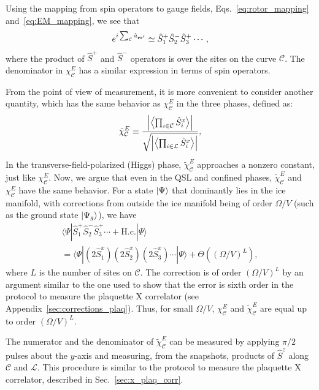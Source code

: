 \documentclass[twocolumn,superscriptaddress,amsmath,amssymb,aps,prx,nofootinbib]{revtex4-2}
\begin{document}
Using the mapping from spin operators to gauge fields, Eqs.~\eqref{eq:rotor_mapping} and~\eqref{eq:EM_mapping}, we see that
\begin{equation} 
   e^{i\sum_\mathcal{C} \hat{a}_{\vb{r} \vb{r}'}} \simeq \hat{S}_1^+\hat{S}_2^-\hat{S}_3^+\cdots,
\end{equation}
where the product of $\hat{S}^+$ and $ \hat{S}^-$ operators is over the sites on the curve $\mathcal{C}$.  The denominator in $\chi_{\mathcal{C}}^E$ has a similar expression in terms of spin operators. 

From the point of view of measurement, it is more convenient to consider another quantity,  which has the same behavior as $\chi_\mathcal{C}^E$ in the three phases, defined as:
\begin{equation}
\tilde{\chi}_\mathcal{C}^E \equiv \frac{\abs{ \expval{ \prod_{i\in \mathcal{C}} \hat{S}_i^x  } } }{\sqrt{ \abs{ \expval{ \prod_{i\in \mathcal{L}} \hat{S}_i^x  }  }}},
\end{equation}
In the transverse-field-polarized (Higgs) phase, $\tilde{\chi}_\mathcal{C}^E$ approaches a nonzero constant, just like $\chi_\mathcal{C}^E$. Now, we argue that even in the QSL and confined phases, $\tilde{\chi}_\mathcal{C}^E$ and $\chi_\mathcal{C}^E$ have the same behavior.  
For a state $\ket{\Psi} $ that dominantly lies in the ice manifold, with corrections from outside the ice manifold being of order $\Omega/V$ (such as the ground state $\ket{\Psi_g}$),  we have
\begin{multline}
  \langle \Psi | \hat{S}_1^+ \hat{S}_2^- \hat{S}_3^+ \cdots + \text{H.c.} | \Psi \rangle \\ = \langle \Psi | (2\hat{S}_1^x) (2\hat{S}_2^x) (2\hat{S}_3^x) \cdots |\Psi \rangle + \Theta \left( (\Omega/V)^L \right),
\end{multline}
where $L$ is the number of sites on $\mathcal{C}$. The correction is of order $( \Omega/V )^L$ by an argument similar to the one used to show that the error is sixth order in the protocol to measure the plaquette X correlator (see Appendix~\ref{sec:corrections_plaq}). Thus, for small $\Omega/V$, $\chi_\mathcal{C}^E$ and $\tilde{\chi}_\mathcal{C}^E$ are equal up to order $(\Omega/V)^L$. 

The numerator and the denominator of $\tilde{\chi}_\mathcal{C}^E$ can be measured by applying $\pi/2$ pulses about the $y$-axis and measuring, from the snapshots, products of $\hat{S}^z$ along $\mathcal{C}$ and $\mathcal{L}$. This procedure is similar to the protocol to measure the plaquette X correlator, described in Sec.~\ref{sec:x_plaq_corr}. 
\end{document}
